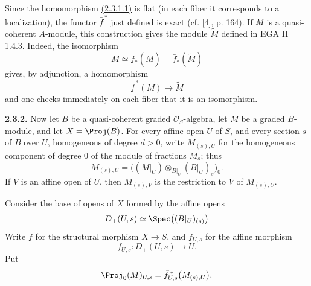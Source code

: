 Since the homomorphism \hyperlink{sga6.e06.eq.2-3-1-1}{(2.3.1.1)} is flat (in each fiber it corresponds to a localization), the functor \(\bar f^{\,*}\) just defined is exact (cf. [4], p. 164). If \(M\) is a quasi-coherent \(A\)-module, this construction gives the module \(\widetilde M\) defined in EGA II 1.4.3. Indeed, the isomorphism
\[
  M\simeq f_*(\widetilde M)=\bar f_*(\widetilde M)
\]
gives, by adjunction, a homomorphism
\[
  \bar f^{\,*}(M)\longrightarrow \widetilde M
\]
and one checks immediately on each fiber that it is an isomorphism.

\textbf{2.3.2.} Now let \(B\) be a quasi-coherent graded \(\mathcal O_S\)-algebra, let \(M\) be a graded \(B\)-module, and let \(X=\Proj(B)\). For every affine open \(U\) of \(S\), and every section \(s\) of \(B\) over \(U\), homogeneous of degree \(d>0\), write \(M_{(s),U}\) for the homogeneous component of degree \(0\) of the module of fractions \(M_s\); thus
\[
  M_{(s),U}=
  \bigl((M|_U)\otimes_{B|_U}(B|_U)_s\bigr)_0 .
\]
If \(V\) is an affine open of \(U\), then \(M_{(s),V}\) is the restriction to \(V\) of \(M_{(s),U}\).

Consider the base of opens of \(X\) formed by the affine opens
\[
  D_+(U,s)\simeq \Spec\bigl((B|_U)_{(s)}\bigr)
\]
Write \(f\) for the structural morphism \(X\to S\), and \(f_{U,s}\) for the affine morphism
\[
  f_{U,s}:D_+(U,s)\longrightarrow U .
\]
Put
\[
  \Proj_0(M)_{U,s}
  =
  \bar f_{U,s}^{\,*}\bigl(M_{(s),U}\bigr).
\]

